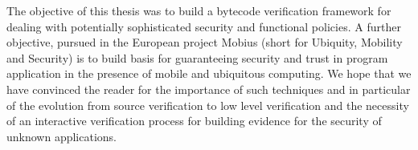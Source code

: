 The objective of this thesis was to build a bytecode verification framework
 for dealing with potentially sophisticated security and functional policies. A further objective, pursued in the European project
 Mobius (short for Ubiquity, Mobility and Security) 
is to build basis for guaranteeing security and trust in program application in the presence of mobile and ubiquitous computing. We hope that we have convinced
the reader for the importance of such techniques and in particular of the evolution from source verification to
 low level verification  and the necessity of an interactive verification process for building evidence for the security of unknown applications. 
